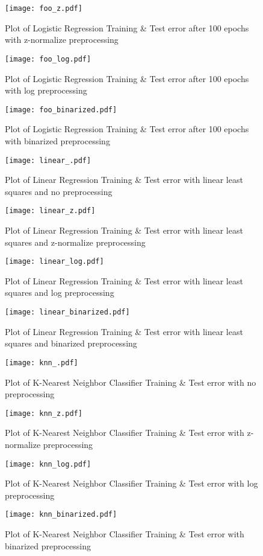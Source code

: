 \documentclass[11pt, oneside]{article}
\begin{document}
\begin{figure}[h]
\centering
\texttt{[image: foo\_z.pdf]}
\caption{Plot of Logistic Regression Training \& Test error after 100 epochs with z-normalize preprocessing}
\end{figure}

\begin{figure}[h]
\centering
\texttt{[image: foo\_log.pdf]}
\caption{Plot of Logistic Regression Training \& Test error after 100 epochs with log preprocessing}
\end{figure}

\begin{figure}
\centering
\texttt{[image: foo\_binarized.pdf]}
\caption{Plot of Logistic Regression Training \& Test error after 100 epochs with binarized preprocessing}
\end{figure}

\begin{figure}[h]
\centering
\texttt{[image: linear\_.pdf]}
\caption{Plot of Linear Regression Training \& Test error with linear least squares and no preprocessing}
\end{figure}

\begin{figure}[h]
\centering
\texttt{[image: linear\_z.pdf]}
\caption{Plot of Linear Regression Training \& Test error with linear least squares and z-normalize preprocessing}
\end{figure}

\begin{figure}[h]
\centering
\texttt{[image: linear\_log.pdf]}
\caption{Plot of Linear Regression Training \& Test error with linear least squares and log preprocessing}
\end{figure}

\begin{figure}[h]
\centering
\texttt{[image: linear\_binarized.pdf]}
\caption{Plot of Linear Regression Training \& Test error with linear least squares and binarized preprocessing}
\end{figure}

\begin{figure}[h]
\centering
\texttt{[image: knn\_.pdf]}
\caption{Plot of K-Nearest Neighbor Classifier Training \& Test error with no preprocessing}
\end{figure}

\begin{figure}[h]
\centering
\texttt{[image: knn\_z.pdf]}
\caption{Plot of K-Nearest Neighbor Classifier Training \& Test error with z-normalize preprocessing}
\end{figure}

\begin{figure}[h]
\centering
\texttt{[image: knn\_log.pdf]}
\caption{Plot of K-Nearest Neighbor Classifier Training \& Test error with log preprocessing}
\end{figure}

\begin{figure}[h]
\centering
\texttt{[image: knn\_binarized.pdf]}
\caption{Plot of K-Nearest Neighbor Classifier Training \& Test error with binarized preprocessing}
\end{figure}
\end{document}
